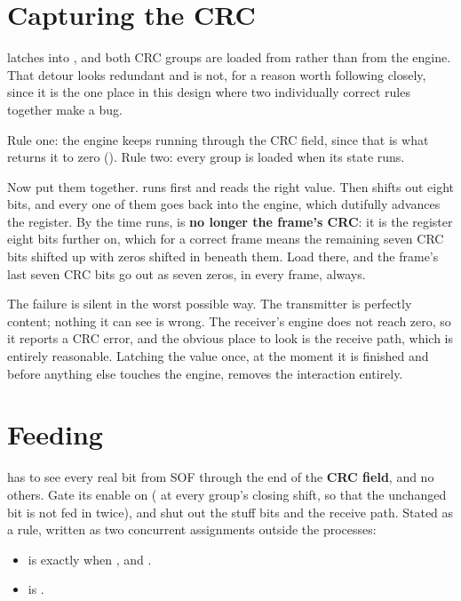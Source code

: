 \section{Capturing the CRC}
\label{c16:sec:crccapture}

 latches  into , and both CRC groups are loaded
from  rather than from the engine. That detour looks redundant and is not, for a reason
worth following closely, since it is the one place in this design where two individually correct
rules together make a bug.

Rule one: the engine keeps running through the CRC field, since that is what returns it to zero
(). Rule two: every group is loaded when its  state runs.

Now put them together.  runs first and reads the right value. Then
 shifts out eight bits, and every one of them goes back into the engine, which
dutifully advances the register. By the time  runs,  is
\textbf{no longer the frame's CRC}: it is the register eight bits further on, which for a correct
frame means the remaining seven CRC bits shifted up with zeros shifted in beneath them. Load
 there, and the frame's last seven CRC bits go out as seven zeros, in
every frame, always.

The failure is silent in the worst possible way. The transmitter is perfectly content; nothing it can
see is wrong. The receiver's engine does not reach zero, so it reports a CRC error, and the obvious
place to look is the receive path, which is entirely reasonable. Latching the value once, at the
moment it is finished and before anything else touches the engine, removes the interaction entirely.

\section{Feeding }
\label{c16:sec:crcfeed}

 has to see every real bit from SOF through the end of the \textbf{CRC field}, and no
others. Gate its enable on  ( at every group's closing shift,
so that the unchanged bit is not fed in twice), and shut out the stuff bits and the receive path.
Stated as a rule, written as two concurrent assignments outside the processes:
\begin{itemize}
  \item {} is  exactly when ,
     and .
  \item {} is .
\end{itemize}

